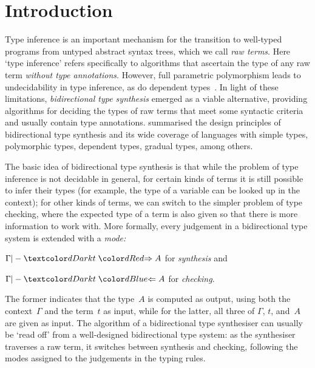 
\section{Introduction}\label{sec:intro}

Type inference is an important mechanism for the transition to well-typed programs from untyped abstract syntax trees, which we call \emph{raw terms}.
Here `type inference' refers specifically to algorithms that ascertain the type of any raw term \emph{without type annotations}.
However, full parametric polymorphism leads to undecidability in type inference, as do dependent types~\cite{Wells1999,Dowek1993}.
In light of these limitations, \emph{bidirectional type synthesis} emerged as a viable alternative, providing algorithms for deciding the types of raw terms that meet some syntactic criteria and usually contain type annotations.
\citet{Dunfield2021} summarised the design principles of bidirectional type synthesis and its wide coverage of languages with simple types, polymorphic types, dependent types, gradual types, among others.

The basic idea of bidirectional type synthesis is that while the problem of type inference is not decidable in general, for certain kinds of terms it is still possible to infer their types (for example, the type of a variable can be looked up in the context); for other kinds of terms, we can switch to the simpler problem of type checking, where the expected type of a term is also given so that there is more information to work with.
More formally, every judgement in a bidirectional type system is extended with a \emph{mode:}
\begin{inlineenum}
  \item $\Gamma |- \isTerm{t} \syn A$ for \emph{synthesis} and 
  \item $\Gamma |- \isTerm{t} \chk A$ for \emph{checking}.
\end{inlineenum}
The former indicates that the type~$A$ is computed as output, using both the context~$\Gamma$ and the term~$t$ as input, while for the latter, all three of $\Gamma$, $t$, and~$A$ are given as input.
The algorithm of a bidirectional type synthesiser can usually be `read off' from a well-designed bidirectional type system: as the synthesiser traverses a raw term, it switches between synthesis and checking, following the modes assigned to the judgements in the typing rules.

